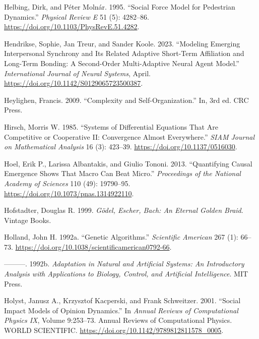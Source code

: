 \documentclass[
  a4paper,
  DIV=11,
  numbers=noendperiod]{scrreprt}
\newlength{\cslhangindent}
\newlength{\cslentryspacingunit} %
\newenvironment{CSLReferences}[2] %
 {%
  \setlength{\parindent}{0pt}
  \ifodd #1
  \let\oldpar\par
  \def\par{\hangindent=\cslhangindent\oldpar}
  \fi
  \setlength{\parskip}{#2\cslentryspacingunit}
 }%
 {}
\begin{document}
\begin{CSLReferences}{1}{0}
\leavevmode{}%
Helbing, Dirk, and Péter Molnár. 1995. {``Social Force Model for
Pedestrian Dynamics.''} \emph{Physical Review E} 51 (5): 4282--86.
\url{https://doi.org/10.1103/PhysRevE.51.4282}.

\leavevmode{}%
Hendrikse, Sophie, Jan Treur, and Sander Koole. 2023. {``Modeling
{Emerging Interpersonal Synchrony} and Its {Related Adaptive Short-Term
Affiliation} and {Long-Term Bonding}: {A Second-Order Multi-Adaptive
Neural Agent Model}.''} \emph{International Journal of Neural Systems},
April. \url{https://doi.org/10.1142/S0129065723500387}.

\leavevmode{}%
Heylighen, Francis. 2009. {``Complexity and Self-Organization.''} In,
3rd ed. CRC Press.

\leavevmode{}%
Hirsch, Morris W. 1985. {``Systems of {Differential Equations} That Are
{Competitive} or {Cooperative II}: {Convergence Almost Everywhere}.''}
\emph{SIAM Journal on Mathematical Analysis} 16 (3): 423--39.
\url{https://doi.org/10.1137/0516030}.

\leavevmode{}%
Hoel, Erik P., Larissa Albantakis, and Giulio Tononi. 2013.
{``Quantifying Causal Emergence Shows That Macro Can Beat Micro.''}
\emph{Proceedings of the National Academy of Sciences} 110 (49):
19790--95. \url{https://doi.org/10.1073/pnas.1314922110}.

\leavevmode{}%
Hofstadter, Douglas R. 1999. \emph{Gödel, {Escher}, {Bach}: {An Eternal
Golden Braid}}. {Vintage Books}.

\leavevmode{}%
Holland, John H. 1992a. {``Genetic {Algorithms}.''} \emph{Scientific
American} 267 (1): 66--73.
\url{https://doi.org/10.1038/scientificamerican0792-66}.

\leavevmode{}%
---------. 1992b. \emph{Adaptation in {Natural} and {Artificial
Systems}: {An Introductory Analysis} with {Applications} to {Biology},
{Control}, and {Artificial Intelligence}}. {MIT Press}.

\leavevmode{}%
Holyst, Janusz A., Krzysztof Kacperski, and Frank Schweitzer. 2001.
{``Social Impact Models of Opinion Dynamics.''} In \emph{Annual
{Reviews} of {Computational Physics IX}}, Volume 9:253--73. Annual
{Reviews} of {Computational Physics}. {WORLD SCIENTIFIC}.
\url{https://doi.org/10.1142/9789812811578_0005}.


\end{CSLReferences}
\end{document}
